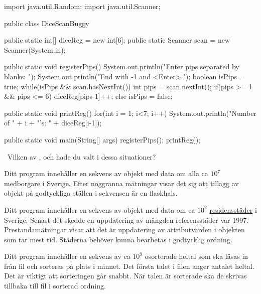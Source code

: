 {\SubtaskSolved  \begin{Code}[language=Java,numbers=left]
import java.util.Random;
import java.util.Scanner;

public class DiceScanBuggy {
	public static int[] diceReg = new int[6];
	public static Scanner scan = new Scanner(System.in);

	public static void registerPips() {
		System.out.println("Enter pips separated by blanks: ");
		System.out.println("End with -1 and <Enter>.");
		boolean isPips = true;
		while(isPips && scan.hasNextInt()){
			int pips = scan.nextInt();
			if(pips >= 1 && pips <= 6) {
				diceReg[pips-1]++;
			} else {
				isPips = false;
			}
		}
	}

	public static void printReg(){
		for(int i = 1; i<7; i++) {
		System.out.println("Number of " + i + "'s: " + diceReg[i-1]);
		}
	}

	public static void main(String[] args) {
		registerPips();
		printReg();
	}
}
\end{Code}


\QUESTEND









\QUESTBEGIN

\Task  \what~\Pen  Vilken av ,  och  hade du valt i dessa situationer?

\Subtask Ditt program innehåller en sekvens av objekt med data om alla ca $10^7$ medborgare i Sverige. Efter noggranna mätningar visar det sig att tillägg av objekt på godtyckliga ställen i sekvensen är en flaskhals.

\Subtask Ditt program innehåller en sekvens av objekt med data om ca $10^2$ \href{https://sv.wikipedia.org/wiki/Residensstad#Sverige}{residensstäder} i Sverige. Senast det skedde en uppdatering av mängden referensstäder var 1997. Prestandamätningar visar att det är uppdatering av attributvärden i objekten som tar mest tid. Städerna behöver kunna bearbetas i godtycklig ordning.

\Subtask Ditt program innehåller en sekvens av ca $10^9$ osorterade heltal som ska läsas in från fil och sorteras på plats i minnet. Det första talet i filen anger antalet heltal. Det är viktigt att sorteringen går snabbt. När talen är sorterade ska de skrivas tillbaka till fil i sorterad ordning.

}
